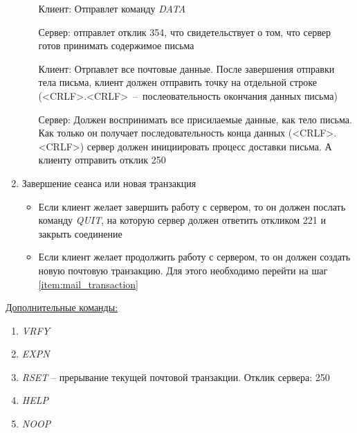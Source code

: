 \documentclass[a4paper,12pt]{report}
\begin{document}
\begin{enumerate}
\begin{enumerate}
	         Клиент: Отправлет команду \textit{DATA} 
	         
	         Сервер: отправлет отклик 354, что свидетельствует о том, что сервер готов принимать содержимое письма
	         
	         Клиент: Отрпавлет все почтовые данные. После завершения отправки тела письма, клиент должен отправить точку на отдельной строке (<CRLF>.<CRLF>~--~послеовательность окончания данных письма)
	         
	         Сервер: Должен воспринимать все присилаемые данные, как тело письма. Как только он получает последовательность конца данных (<CRLF>.<CRLF>) сервер должен инициировать процесс доставки письма. А клиенту отправить отклик 250
	     \end{enumerate}
	     
	     \item Завершение сеанса или новая транзакция
	     \begin{itemize}
	         \item Если клиент желает завершить работу с сервером, то он должен послать команду \textit{QUIT}, на которую сервер должен ответить откликом 221 и закрыть соединение
	         \item Если клиент желает продолжить работу с сервером, то он должен создать новую почтовую транзакцию. Для этого необходимо перейти на шаг \ref{item:mail_transaction}
	     \end{itemize}
	 \end{enumerate}
	 
	 \underline{Дополнительные команды:}
	 \begin{enumerate}
	     \item \textit{VRFY}
	     \item \textit{EXPN}
	     \item \textit{RSET} -- прерывание текущей почтовой транзакции. Отклик сервера: 250
	     \item \textit{HELP}
	     \item \textit{NOOP}
	 \end{enumerate}
	
\end{document}
